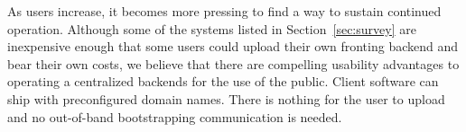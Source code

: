 \documentclass{sig-alternate}
\newcommand{\meek}{meek\xspace}
\begin{document}




As users increase, it becomes more pressing
to find a way to sustain continued operation.
Although some of the systems listed in Section~\ref{sec:survey}
are inexpensive enough that some users could upload their own fronting backend
and bear their own costs,
we believe that there are compelling usability advantages
to operating a centralized backends for the use of the public.
Client software can ship with preconfigured domain names.
There is nothing for the user to upload and no out-of-band bootstrapping communication is needed.

\end{document}
